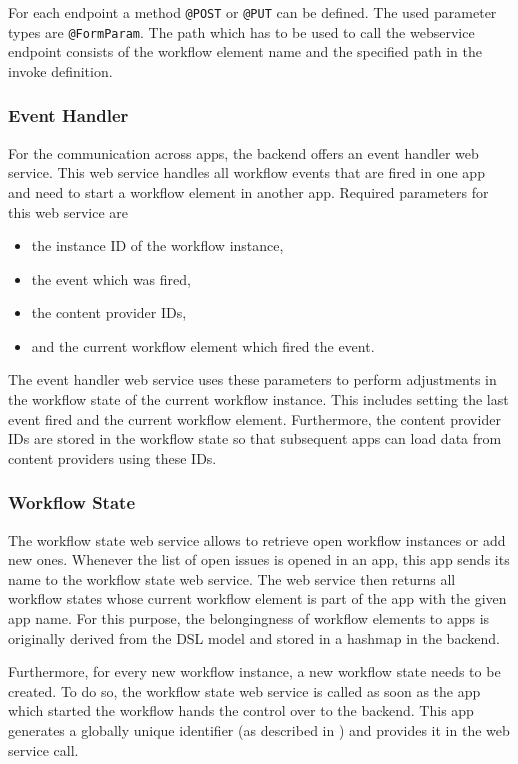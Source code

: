 For each endpoint a method \lstinline|@POST| or \lstinline|@PUT| can be defined. The used parameter types are \lstinline|@FormParam|. The path which has to be used to call the webservice endpoint consists of the workflow element name and the specified path in the invoke definition.

\subsubsection{Event Handler} 

For the communication across apps, the backend offers an event handler web service. This web service handles all workflow events that are fired in one app and need to start a workflow element in another app. Required parameters for this web service are

\begin{itemize}
\item the instance ID of the workflow instance,
\item the event which was fired,
\item the content provider IDs,
\item and the current workflow element which fired the event.
\end{itemize}

The event handler web service uses these parameters to perform adjustments in the workflow state of the current workflow instance. This includes setting the last event fired and the current workflow element. Furthermore, the content provider IDs are stored in the workflow state so that subsequent apps can load data from content providers using these IDs.

\subsubsection{Workflow State} 

The workflow state web service allows to retrieve open workflow instances or add new ones. Whenever the list of open issues is opened in an app, this app sends its name to the workflow state web service. The web service then returns all workflow states whose current workflow element is part of the app with the given app name. For this purpose, the belongingness of workflow elements to apps is originally derived from the DSL model and stored in a hashmap in the backend.

Furthermore, for every new workflow instance, a new workflow state needs to be created. To do so, the workflow state web service is called as soon as the app which started the workflow hands the control over to the backend. This app generates a globally unique identifier (as described in ) and provides it in the web service call.

